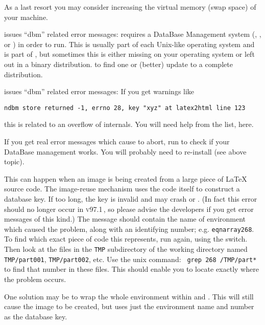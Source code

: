 \begin{htmllist}
As a last resort you may consider increasing the virtual memory
(swap space) of your machine.


\item [\fn{install-test} issues ``dbm'' related error messages: ]\latex{~\\}%
\latextohtml{} requires a DataBase Management system (,
, or ) in order to run.
This is usually part of each Unix-like operating system and
 is part of , but sometimes this is either missing
on your operating system or left out in a binary \Perl{} distribution.
to find one or (better) update to a complete  distribution.

\item [\fn{latex2html} issues ``dbm'' related error messages: ]
If you get warnings like
\begin{verbatim}
ndbm store returned -1, errno 28, key "xyz" at latex2html line 123
\end{verbatim}
this is related to an overflow of \latextohtml{} internals.
You will need help from the list, here.
\smallskip

If you get real error messages which cause \latextohtml{} to abort,
run  to check if your DataBase management works.
You will probably need to re-install  (see above topic).


This can happen when an image is being created from a large piece
of \LaTeX{} source code. The image-reuse mechanism uses the code itself
to construct a database key. If too long, the key is invalid and may
crash  or . (In fact this error should no longer
occur in \textsc{v97.1}\,, so please advise the \latextohtml{} developers if
you get error messages of this kind.)\html{\\}
The message should contain the name of environment which caused the problem,
along with an identifying number; e.g. \texttt{eqnarray268}.
To find which exact piece of code this represents, run \latextohtml{}
again, using the  switch. Then look at the files
in the \texttt{TMP} subdirectory of the working directory
named \texttt{TMP/part001}, \texttt{TMP/part002}, etc.
Use the unix  command: \texttt{ grep 268 }\texttt{/TMP/part* }
to find that number in these files. 
This should enable you to locate exactly where the problem occurs.

One solution may be to wrap the whole environment within
 and .
This will still cause the image to be created, 
but uses just the environment name and number as the database key.




\end{htmllist}
